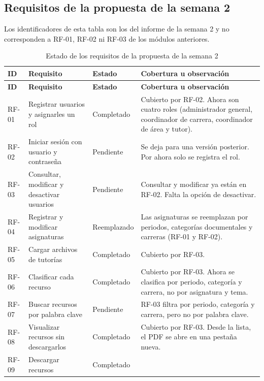 \documentclass[12pt,a4paper,oneside]{article}
\begin{document}
\subsection{Requisitos de la propuesta de la semana 2}

Los identificadores de esta tabla son los del informe de la semana 2 y no corresponden a
RF-01, RF-02 ni RF-03 de los módulos anteriores.

\begingroup\footnotesize
\setlength{\tabcolsep}{3pt}
\begin{longtable}{>{\raggedright\arraybackslash}p{1.3cm}>{\raggedright\arraybackslash}p{4.6cm}>{\raggedright\arraybackslash}p{1.9cm}>{\raggedright\arraybackslash}p{7.0cm}}
\caption{Estado de los requisitos de la propuesta de la semana 2}\label{tab:matriz-sem2}\\
\toprule
\textbf{ID} & \textbf{Requisito} & \textbf{Estado} & \textbf{Cobertura u observación} \\
\midrule
\endfirsthead
\toprule
\textbf{ID} & \textbf{Requisito} & \textbf{Estado} & \textbf{Cobertura u observación} \\
\midrule
\endhead
RF-01 & Registrar usuarios y asignarles un rol & Completado &
Cubierto por RF-02. Ahora son cuatro roles (administrador general, coordinador de carrera,
coordinador de área y tutor). \\
RF-02 & Iniciar sesión con usuario y contraseña & Pendiente &
Se deja para una versión posterior. Por ahora solo se registra el rol. \\
RF-03 & Consultar, modificar y desactivar usuarios & Pendiente &
Consultar y modificar ya están en RF-02. Falta la opción de desactivar. \\
RF-04 & Registrar y modificar asignaturas & Reemplazado &
Las asignaturas se reemplazan por periodos, categorías documentales y carreras (RF-01 y
RF-02). \\
RF-05 & Cargar archivos de tutorías & Completado & Cubierto por RF-03. \\
RF-06 & Clasificar cada recurso & Completado &
Cubierto por RF-03. Ahora se clasifica por periodo, categoría y carrera, no por asignatura
y tema. \\
RF-07 & Buscar recursos por palabra clave & Pendiente &
RF-03 filtra por periodo, categoría y carrera, pero no por palabra clave. \\
RF-08 & Visualizar recursos sin descargarlos & Completado &
Cubierto por RF-03. Desde la lista, el PDF se abre en una pestaña nueva. \\
RF-09 & Descargar recursos & Completado &

\end{longtable}
\end{document}
